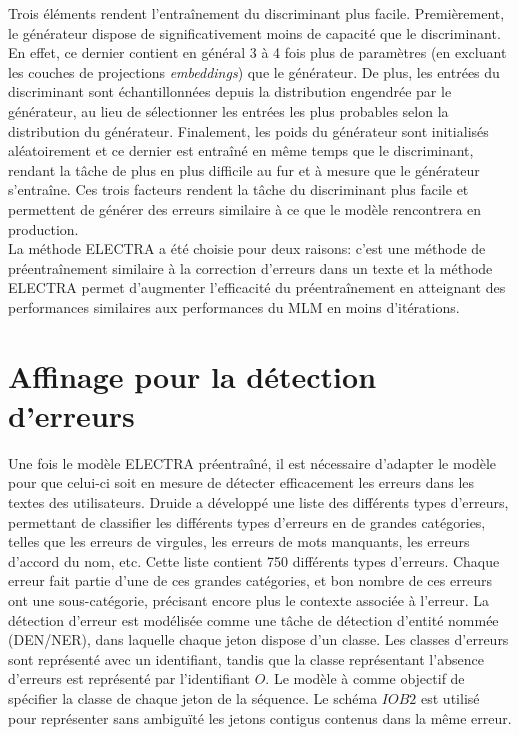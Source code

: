 \documentclass[12pt,twoside,maitrise]{dms}
\theoremstyle{definition}
\numberwithin{equation}{section}
\numberwithin{table}{chapter}
\numberwithin{figure}{chapter}
\begin{document}
Trois éléments rendent l'entraînement du discriminant plus facile.
Premièrement, le générateur dispose de significativement moins de capacité que
le discriminant. En effet, ce dernier contient en général 3 à 4 fois plus de
paramètres (en excluant les couches de projections \textit{embeddings}) que le
générateur. De plus, les entrées du discriminant sont échantillonnées depuis la
distribution engendrée par le générateur, au lieu de sélectionner les entrées
les plus probables selon la distribution du générateur. Finalement, les poids
du générateur sont initialisés aléatoirement et ce dernier est entraîné en même
temps que le discriminant, rendant la tâche de plus en plus difficile au fur et
à mesure que le générateur s'entraîne. Ces trois facteurs rendent la tâche du
discriminant plus facile et permettent de générer des erreurs similaire à ce
que le modèle rencontrera en production.\\

La méthode ELECTRA a été choisie pour deux raisons: c'est une méthode de
préentraînement similaire à la correction d'erreurs dans un texte et la méthode
ELECTRA permet d'augmenter l'efficacité du préentraînement en atteignant des
performances similaires aux performances du MLM en moins d'itérations.

\section{Affinage pour la détection d'erreurs}
Une fois le modèle ELECTRA préentraîné, il est nécessaire d'adapter le modèle
pour que celui-ci soit en mesure de détecter efficacement les erreurs dans les
textes des utilisateurs. Druide a développé une liste des différents types
d'erreurs, permettant de classifier les différents types d'erreurs en de
grandes catégories, telles que les erreurs de virgules, les erreurs de mots
manquants, les erreurs d'accord du nom, etc. Cette liste contient 750
différents types d'erreurs. Chaque erreur fait partie d'une de ces grandes
catégories, et bon nombre de ces erreurs ont une sous-catégorie, précisant
encore plus le contexte associée à l'erreur. La détection d'erreur est
modélisée comme une tâche de détection d'entité nommée (DEN/NER), dans laquelle
chaque jeton dispose d'un classe. Les classes d'erreurs sont représenté avec un
identifiant, tandis que la classe représentant l'absence d'erreurs est
représenté par l'identifiant $O$. Le modèle à comme objectif de spécifier la
classe de chaque jeton de la séquence. Le schéma $IOB2$ \cite{schemas} est
utilisé pour représenter sans ambiguïté les jetons contigus contenus dans la
même erreur.
\end{document}
